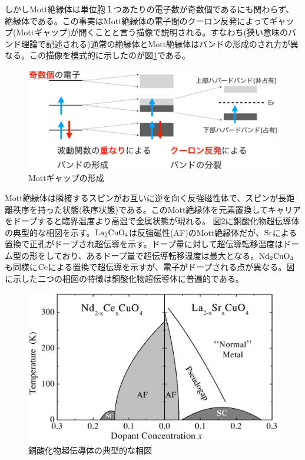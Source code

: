 しかしMott絶縁体は単位胞１つあたりの電子数が奇数個であるにも関わらず、絶縁体である。この事実はMott絶縁体の電子間のクーロン反発によってギャップ(Mottギャップ)が開くことと言う描像で説明される。すなわち(狭い意味のバンド理論で記述される)通常の絶縁体とMott絶縁体はバンドの形成のされ方が異なる。この描像を模式的に示したのが図\ref{fig:Mott_gap}である。
\begin{figure}[!h]
    \begin{center}
   \includegraphics[width=0.6\hsize]{Introduction/Mott_gap.eps}
  \end{center}
  \caption{Mottギャップの形成}
  \label{fig:Mott_gap}
\end{figure}

Mott絶縁体は隣接するスピンがお互いに逆を向く反強磁性体で、スピンが長距離秩序を持った状態(秩序状態)である。このMott絶縁体を元素置換してキャリアをドープすると臨界温度より高温で金属状態が現れる。
図\ref{fig:phase_diagram}に銅酸化物超伝導体の典型的な相図を示す\cite{Andrea2003}。$\rm La_2CuO_4$は反強磁性(AF)のMott絶縁体だが、$\rm Sr$による置換で正孔がドープされ超伝導を示す。ドープ量に対して超伝導転移温度はドーム型の形をしており、あるドープ量で超伝導転移温度は最大となる。$\rm Nd_2CuO_4$も同様に$\rm Ce$による置換で超伝導を示すが、電子がドープされる点が異なる。図に示した二つの相図の特徴は銅酸化物超伝導体に普遍的である\cite{Lee2006}。
\begin{figure}[!h]
    \begin{center}
   \includegraphics[width=0.6\hsize]{Introduction/phase_diagram.eps}
  \end{center}
  \caption{銅酸化物超伝導体の典型的な相図\cite{Andrea2003}}
  \label{fig:phase_diagram}
\end{figure}

